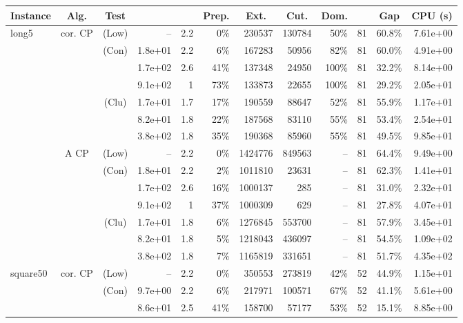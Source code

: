 \documentclass[11pt]{amsart}
\newenvironment{outdent}
{\begin{list}{}{\leftmargin-2cm\rightmargin\leftmargin}\centering\item\relax}
{\end{list}\ignorespacesafterend}
\theoremstyle{plain}
\theoremstyle{remark}
\begin{document}
\begin{table}
\begin{outdent}
\begin{small}
\begin{tabular}{|l|ccr|rr|rrr|rr|r|}
\hline
Instance  
& \multicolumn{1}{c}{Alg.} 
& \multicolumn{1}{c}{Test} 
& \multicolumn{1}{c|}{}
& \multicolumn{1}{c}{} 
& \multicolumn{1}{c|}{Prep.} 
& \multicolumn{1}{c}{Ext.} 
& \multicolumn{1}{c}{Cut.} 
& \multicolumn{1}{c|}{Dom.} 
& \multicolumn{1}{c}{} 
& \multicolumn{1}{c|}{Gap} 
& \multicolumn{1}{c|}{CPU (s)} \\
\hline
long5 & cor. CP & (Low) & --  &2.2 & 0\% & 230537 & 130784 & 50\% &81 & 60.8\% & 7.61e+00 \\
& & (Con) & 1.8e+01 & 2.2 & 6\% & 167283 & 50956 & 82\% &81 & 60.0\% & 4.91e+00 \\
& &  & 1.7e+02 & 2.6 & 41\% & 137348 & 24950 & 100\% &81 & 32.2\% & 8.14e+00 \\
& &  & 9.1e+02 & 1 & 73\% & 133873 & 22655 & 100\% &81 & 29.2\% & 2.05e+01 \\
& & (Clu) & 1.7e+01 & 1.7 & 17\% & 190559 & 88647 & 52\% &81 & 55.9\% & 1.17e+01 \\
& &  & 8.2e+01 & 1.8 & 22\% & 187568 & 83110 & 55\% &81 & 53.4\% & 2.54e+01 \\
& &  & 3.8e+02 & 1.8 & 35\% & 190368 & 85960 & 55\% &81 & 49.5\% & 9.85e+01 \\
&A CP & (Low) & --  &2.2 & 0\% & 1424776 & 849563 & -- &81 & 64.4\% & 9.49e+00 \\
& & (Con) & 1.8e+01 & 2.2 & 2\% & 1011810 & 23631 & -- &81 & 62.3\% & 1.41e+01 \\
& &  & 1.7e+02 & 2.6 & 16\% & 1000137 & 285 & -- &81 & 31.0\% & 2.32e+01 \\
& &  & 9.1e+02 & 1 & 37\% & 1000309 & 629 & -- &81 & 27.8\% & 4.07e+01 \\
& & (Clu) & 1.7e+01 & 1.8 & 6\% & 1276845 & 553700 & -- &81 & 57.9\% & 3.45e+01 \\
& &  & 8.2e+01 & 1.8 & 5\% & 1218043 & 436097 & -- &81 & 54.5\% & 1.09e+02 \\
& &  & 3.8e+02 & 1.8 & 7\% & 1165819 & 331651 & -- &81 & 51.7\% & 4.35e+02 \\
\hline
square50 & cor. CP & (Low) & --  &2.2 & 0\% & 350553 & 273819 & 42\% &52 & 44.9\% & 1.15e+01 \\
& & (Con) & 9.7e+00 & 2.2 & 6\% & 217971 & 100571 & 67\% &52 & 41.1\% & 5.61e+00 \\
& &  & 8.6e+01 & 2.5 & 41\% & 158700 & 57177 & 53\% &52 & 15.1\% & 8.85e+00 \\

\end{tabular}
\end{small}
\end{outdent}
\end{table}
\end{document}
